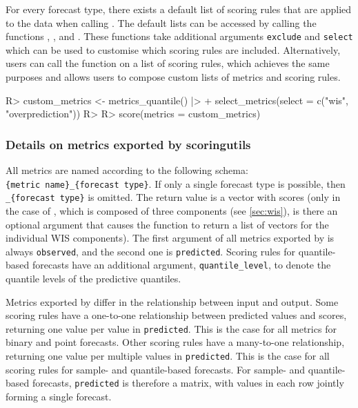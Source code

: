 \documentclass[
]{jss}
\begin{document}
For every forecast type, there exists a default list of scoring rules
that are applied to the data when calling . The default
lists can be accessed by calling the functions ,
,  and
. These functions take additional arguments
\texttt{exclude} and \texttt{select} which can be used to customise
which scoring rules are included. Alternatively, users can call the
function  on a list of scoring rules, which
achieves the same purposes and allows users to compose custom lists of
metrics and scoring rules.

\begin{CodeChunk}
\begin{CodeInput}
R> custom_metrics <- metrics_quantile() |>
+   select_metrics(select = c("wis", "overprediction"))
R> 
R> score(metrics = custom_metrics)
\end{CodeInput}
\end{CodeChunk}

\subsubsection{Details on metrics exported by scoringutils}

All metrics are named according to the following schema:
\texttt{\{metric\ name\}\_\{forecast\ type\}}. If only a single forecast
type is possible, then \texttt{\_\{forecast\ type\}} is omitted. The
return value is a vector with scores (only in the case of ,
which is composed of three components (see \ref{sec:wis}), is there an
optional argument that causes the function to return a list of vectors
for the individual WIS components). The first argument of all metrics
exported by  is always \texttt{observed}, and the
second one is \texttt{predicted}. Scoring rules for quantile-based
forecasts have an additional argument, \texttt{quantile\_level}, to
denote the quantile levels of the predictive quantiles.

Metrics exported by  differ in the relationship
between input and output. Some scoring rules have a one-to-one
relationship between predicted values and scores, returning one value
per value in \texttt{predicted}. This is the case for all metrics for
binary and point forecasts. Other scoring rules have a many-to-one
relationship, returning one value per multiple values in
\texttt{predicted}. This is the case for all scoring rules for sample-
and quantile-based forecasts. For sample- and quantile-based forecasts,
\texttt{predicted} is therefore a matrix, with values in each row
jointly forming a single forecast.
\end{document}
